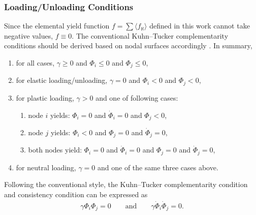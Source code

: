 \subsubsection{Loading/Unloading Conditions}
Since the elemental yield function $f=\sum{}\langle{}f_\aleph\rangle$ defined in this work cannot take negative values, $f\equiv0$.
The conventional Kuhn--Tucker complementarity conditions should be derived based on nodal surfaces accordingly \cite{Simo1998}.
In summary,
\begin{enumerate}
\item for all cases, $\gamma\geqslant0$ and $\Phi_i\leqslant0$ and $\Phi_j\leqslant0$,
\item for elastic loading/unloading, $\gamma=0$ and $\Phi_i<0$ and $\Phi_j<0$,
\item for plastic loading, $\gamma>0$ and one of following cases:
\begin{enumerate}
\item node $i$ yields: $\Phi_i=0$ and $\dot{\Phi}_i=0$ and $\Phi_j<0$,
\item node $j$ yields: $\Phi_i<0$ and $\Phi_j=0$ and $\dot{\Phi}_j=0$,
\item both nodes yield: $\Phi_i=0$ and $\dot{\Phi}_i=0$ and $\Phi_j=0$ and $\dot{\Phi}_j=0$,
\end{enumerate}
\item for neutral loading, $\gamma=0$ and one of the same three cases above.
\end{enumerate}
Following the conventional style, the Kuhn--Tucker complementarity condition and consistency condition can be expressed as
\begin{gather}
\gamma\Phi_i\Phi_j=0\qquad\text{and}\qquad\gamma\dot{\Phi}_i\dot{\Phi}_j=0.
\end{gather}
